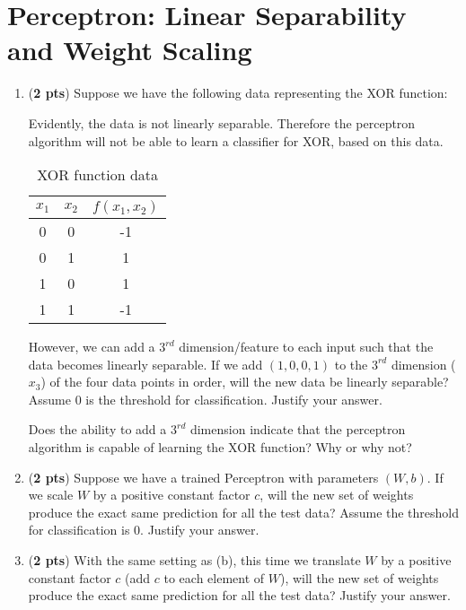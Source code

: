 \documentclass[11pt, letterpaper]{article}
\begin{document}
\section{Perceptron: Linear Separability and Weight Scaling}

\begin{enumerate}[label=(\alph*)]
\item (\textbf{2 pts}) Suppose we have the following data representing the XOR function:


    
Evidently, the data is not linearly separable. Therefore the perceptron algorithm will not be able to learn a classifier for XOR, based on this data.

    \begin{table}[h!]
    \centering
    \begin{tabular}{|c|c|c|}
        \hline    
         $x_1$ & $x_2$ & $f(x_1,x_2)$ \\
        \hline
        0    & 0 & -1 \\
        0    & 1 & 1 \\
        1    & 0 & 1 \\
        1    & 1 & -1 \\        
        \hline
    \end{tabular}
    \caption{XOR function data}
    \label{tab:my_label}
    \end{table}
    
However, we can add a $3^{rd}$ dimension/feature to each input such that the data becomes linearly separable. If we add $(1, 0, 0, 1)$ to the $3^{rd}$ dimension ($x_3$) of the four data points in order, will the new data be linearly separable? Assume 0 is the threshold for classification. Justify your answer.

Does the ability to add a $3^{rd}$ dimension indicate that the perceptron algorithm is capable of learning the XOR function? Why or why not?

\bigskip

\item (\textbf{2 pts}) Suppose we have a trained Perceptron with parameters $(W, b)$. If we scale $W$ by a positive constant factor $c$, will the new set of weights produce the exact same prediction for all the test data? Assume the threshold for classification is 0. Justify your answer.

\bigskip

\item (\textbf{2 pts}) With the same setting as (b), this time we translate $W$ by a positive constant factor $c$ (add $c$ to each element of $W$), will the new set of weights produce the exact same prediction for all the test data? Justify your answer.\\
\bigskip 

\end{enumerate}
\end{document}
